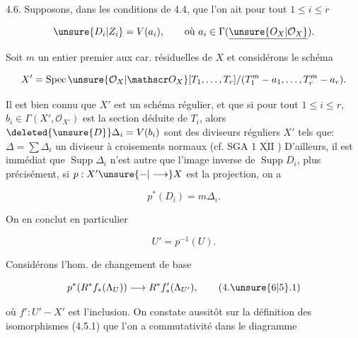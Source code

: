 4.6. Supposons,  dans les conditions de 4.4, que l'on ait pour tout $1\leq i\leq r$

\[
\unsure{D_i|Z_i}=V(a_i),\qquad\text{où }a_i\in\Gamma(\underline{\unsure{O_X|\mathcal O_X}}).
\]

Soit $m$ un entier premier aux car. résiduelles de $X$  et considérons le schéma

\[
X'=\operatorname{Spec}\unsure{\mathcal O_X|\mathscr O_X}[T_1,\ldots,T_r]/(T_1^m-a_1,\ldots,T_r^m-a_r).
\]

Il est  bien connu que $X'$ est un schéma régulier, et que  si pour tout $1\leq i\leq r$,  $b_i\in\Gamma(X',\mathcal O_{X'})$ est la section déduite de $T_i$, alors  $\deleted{\unsure{D}}\Delta_i=V(b_i)$ sont des diviseurs réguliers  $X'$ tels que: $\Delta=\sum\Delta_i$  un diviseur à croisements normaux (cf. SGA 1 $\overline{\underline{\mathrm{XII}}}$ )  D'ailleurs, il est immédiat que $\operatorname{Supp}\Delta_i$ n'est autre que l'image inverse de $\operatorname{Supp}D_i$, plus précisément, si $p:X'\unsure{{-}|\longrightarrow}X$ est la projection, on a

\[
p^*(D_i)=m\Delta_i.
\]

On en conclut en particulier

\[
U'=p^{-1}(U).
\]

Considérons l'hom.  de changement de base

\[
p^*(R^*f_*(\Lambda_U))\longrightarrow R^*f'_*(\Lambda_{U'}),
\tag*{(4.\unsure{6|5}.1)}
\]

où $f':U'-X'$ est l'inclusion.  On constate  aussitôt sur la définition des isomorphismes (4.5.1) que l'on a commutativité dans le diagramme
